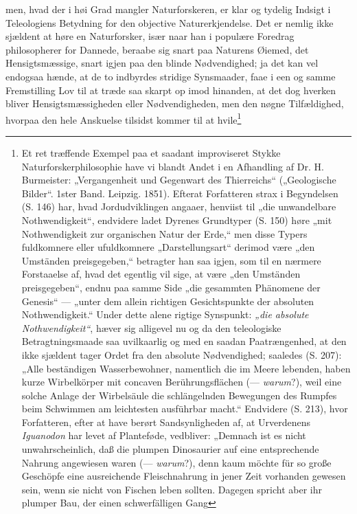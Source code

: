 \documentclass[12pt,a4paper]{book}
\begin{document}
\setcounter{footnote}{0}
men, hvad der i høi Grad mangler Naturforskeren, er klar og tydelig
Indsigt i Teleologiens Betydning for den objective Naturerkjendelse. Det
er nemlig ikke sjældent at høre en Naturforsker, især naar han i populære
Foredrag philosopherer for Dannede, beraabe sig snart paa Naturens Øiemed,
det Hensigtsmæssige, snart igjen paa den blinde Nødvendighed; ja det kan
vel endogsaa hænde, at de to indbyrdes stridige Synsmaader, faae i een og
samme Fremstilling Lov til at træde saa skarpt op imod hinanden, at det
dog hverken bliver Hensigtsmæssigheden eller Nødvendigheden, men den nøgne
Tilfældighed, hvorpaa den hele Anskuelse tilsidst kommer til at
hvile\footnote{Et ret træffende Exempel paa et saadant improviseret Stykke
Naturforskerphilosophie have vi blandt Andet i en Afhandling af Dr. H.
Burmeister: „Vergangenheit und Gegenwart des Thierreichs“ („Geologische
Bilder“. 1ster Band. Leipzig. 1851). Efterat Forfatteren strax i
Begyndelsen (S. 146) har, hvad Jordudviklingen angaaer, henviist til „die
unwandelbare Nothwendigkeit“, endvidere ladet Dyrenes Grundtyper (S. 150)
høre „mit Nothwendigkeit zur organischen Natur der Erde,“ men disse Typers
fuldkomnere eller ufuldkomnere „Darstellungsart“ derimod være „den
Umständen preisgegeben,“ betragter han saa igjen, som til en nærmere
Forstaaelse af, hvad det egentlig vil sige, at være „den Umständen
preisgegeben“, endnu paa samme Side „die gesammten Phänomene der Genesis“
--- „unter dem allein richtigen Gesichtspunkte der absoluten
Nothwendigkeit.“ Under dette alene rigtige Synspunkt: \emph{„die absolute
Nothwendigkeit“}, hæver sig alligevel nu og da den teleologiske
Betragtningsmaade saa uvilkaarlig og med en saadan Paatrængenhed, at den
ikke sjældent tager Ordet fra den absolute Nødvendighed; saaledes (S.
207): „Alle beständigen Wasserbewohner, namentlich die im Meere lebenden,
haben kurze Wirbelkörper mit concaven Berührungsflächen (--- \emph{warum}?),
weil eine solche Anlage der Wirbelsäule die schlängelnden Bewegungen des
Rumpfes beim Schwimmen am leichtesten ausführbar macht.“ Endvidere (S.
213), hvor Forfatteren, efter at have berørt Sandsynligheden af, at
Urverdenens \textit{Iguanodon} har levet af Planteføde, vedbliver:
„Demnach ist es nicht unwahrscheinlich, daß die plumpen Dinosaurier auf
eine entsprechende Nahrung angewiesen waren (--- \emph{warum}?), denn kaum
möchte für so große Geschöpfe eine ausreichende Fleischnahrung in jener
Zeit vorhanden gewesen sein, wenn sie nicht von Fischen leben sollten.
Dagegen spricht aber ihr plumper Bau, der einen schwerfälligen Gang
}
\end{document}
